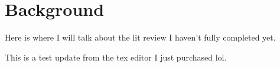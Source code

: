 \chapter{Background}

\par Here is where I will talk about the lit review I haven't fully completed yet.
\par This is a test update from the tex editor I just purchased lol.